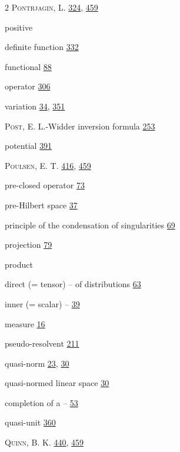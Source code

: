 \begin{multicols}{2}
\noindent \textsc{Pontrjagin}, L. \hyperlink{page.324}{324}, \hyperlink{page.459}{459}\par
\noindent positive\par
\hspace*{1.1em}definite function \hyperlink{page.332}{332}\par
\hspace*{1.1em}functional \hyperlink{page.88}{88}\par
\hspace*{1.1em}operator \hyperlink{page.306}{306}\par
\hspace*{1.1em}variation \hyperlink{page.34}{34}, \hyperlink{page.351}{351}\par
\noindent \textsc{Post}, E. L.-Widder inversion formula \hyperlink{page.253}{253}\par
\noindent potential \hyperlink{page.391}{391}\par
\noindent \textsc{Poulsen}, E. T. \hyperlink{page.416}{416}, \hyperlink{page.459}{459}\par
\noindent pre-closed operator \hyperlink{page.73}{73}\par
\noindent pre-Hilbert space \hyperlink{page.37}{37}\par
\noindent principle of the condensation of singularities \hyperlink{page.69}{69}\par
\noindent projection \hyperlink{page.79}{79}\par
\noindent product\par
\hspace*{1.1em}direct (= tensor) -- of distributions \hyperlink{page.63}{63}\par
\hspace*{1.1em}inner (= scalar) -- \hyperlink{page.39}{39}\par
\hspace*{1.1em}measure \hyperlink{page.16}{16}\par
\noindent pseudo-resolvent \hyperlink{page.211}{211}\par
\noindent quasi-norm \hyperlink{page.23}{23}, \hyperlink{page.30}{30}\par
\noindent quasi-normed linear space \hyperlink{page.30}{30}\par
\hspace*{1.1em}completion of a -- \hyperlink{page.53}{53}\par
\noindent quasi-unit \hyperlink{page.360}{360}\par
\noindent \textsc{Quinn}, B. K. \hyperlink{page.440}{440}, \hyperlink{page.459}{459}\par

\end{multicols}
